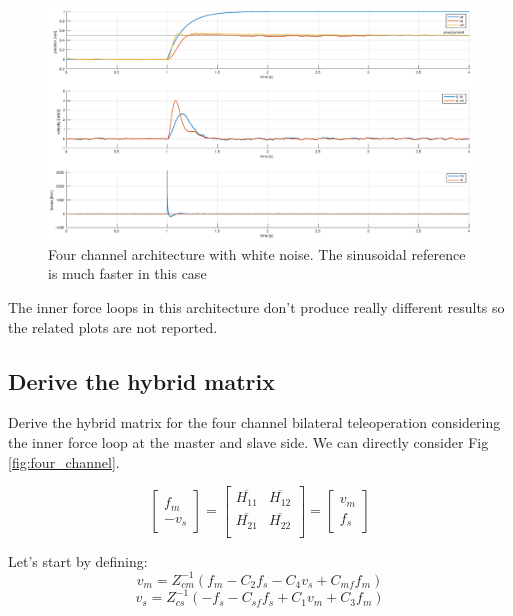 \documentclass[a4paper,12pt]{article}
\begin{document}
\begin{figure}[H]
    \begin{center}
        \hspace*{-4.2cm}
        \includegraphics[scale=0.5]{images/four_step_kalman_2.eps}
    \end{center}
    \caption{Four channel architecture with white noise. The sinusoidal reference is much faster in this case}
    \label{fig:four_noisy}
\end{figure}

\bigskip
\noindent The inner force loops in this architecture don't produce really different results so the related plots are not reported. 

\subsection{Derive the hybrid matrix}

Derive the hybrid matrix for the four channel bilateral teleoperation considering the inner force loop at the master and slave side. We can directly consider Fig \ref{fig:four_channel}.

\[
\begin{bmatrix}  f_m \\ -v_s \end{bmatrix} = \begin{bmatrix}
    \overline{H_{11}} & \overline{H_{12}} \\
    \overline{H_{21}} &  \overline{H_{22}} \\
\end{bmatrix} = \begin{bmatrix}  v_m \\ f_s \end{bmatrix}
\]

\noindent Let's start by defining:
\begin{equation}
    v_m = Z_{cm}^{-1}(f_m -C_2f_s-C_4v_s+C_{mf}f_m)
\end{equation}
\begin{equation}
    v_s = Z_{cs}^{-1}(-f_s -C_{sf}f_s+C_1v_m+C_3f_m)
\end{equation}
\end{document}
